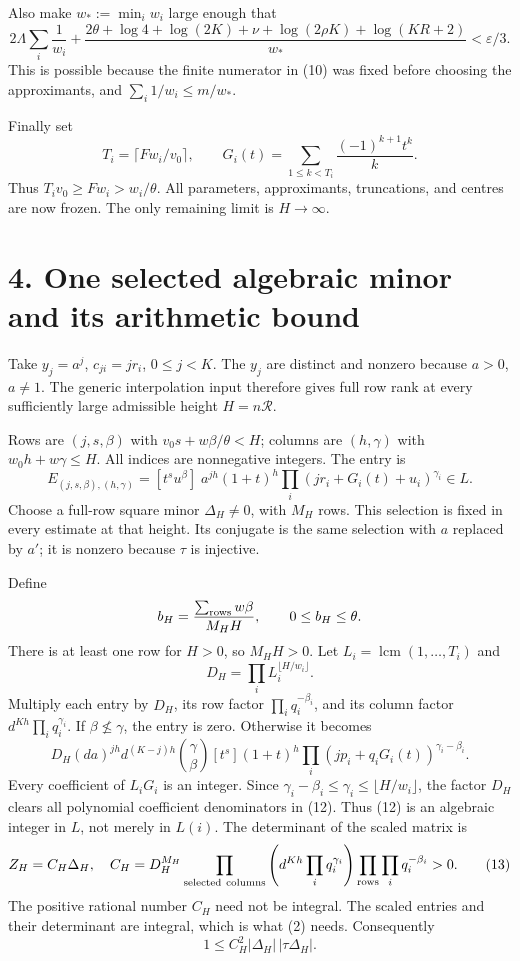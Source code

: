 \documentclass[11pt]{article}
\begin{document}
Also make \(w_*:=\min_iw_i\) large enough that \[
2\Lambda\sum_i\frac1{w_i}
+\frac{2\theta+\log4+\log(2K)+\nu+\log(2\rho K)+\log(KR+2)}{w_*}
<\varepsilon/3.                                    \tag{10}
\] This is possible because the finite numerator in (10) was fixed
before choosing the approximants, and \(\sum_i1/w_i\le m/w_*\).

Finally set \[
T_i=\lceil Fw_i/v_0\rceil,\qquad
G_i(t)=\sum_{1\le k<T_i}\frac{(-1)^{k+1}t^k}{k}.
\] Thus \(T_iv_0\ge Fw_i>w_i/\theta\). All parameters, approximants,
truncations, and centres are now frozen. The only remaining limit is
\(H\to\infty\).

\section{4. One selected algebraic minor and its arithmetic
bound}\label{one-selected-algebraic-minor-and-its-arithmetic-bound}

Take \(y_j=a^j\), \(c_{ji}=jr_i\), \(0\le j<K\). The \(y_j\) are
distinct and nonzero because \(a>0\), \(a\ne1\). The generic
interpolation input therefore gives full row rank at every sufficiently
large admissible height \(H=n\mathcal R\).

Rows are \((j,s,\beta)\) with \(v_0s+w\beta/\theta<H\); columns are
\((h,\gamma)\) with \(w_0h+w\gamma\le H\). All indices are nonnegative
integers. The entry is \[
E_{(j,s,\beta),(h,\gamma)}
=[t^su^\beta]\;a^{jh}(1+t)^h\prod_i(jr_i+G_i(t)+u_i)^{\gamma_i}\in L. \tag{11}
\] Choose a full-row square minor \(\Delta_H\ne0\), with \(M_H\) rows.
This selection is fixed in every estimate at that height. Its conjugate
is the same selection with \(a\) replaced by \(a'\); it is nonzero
because \(\tau\) is injective.

Define \[
b_H=\frac{\sum_{\rm rows}w\beta}{M_HH},\qquad0\le b_H\le\theta.
\] There is at least one row for \(H>0\), so \(M_HH>0\). Let
\(L_i=\operatorname{lcm}(1,\ldots,T_i)\) and \[
D_H=\prod_iL_i^{\lfloor H/w_i\rfloor}.
\] Multiply each entry by \(D_H\), its row factor
\(\prod_iq_i^{-\beta_i}\), and its column factor
\(d^{Kh}\prod_iq_i^{\gamma_i}\). If \(\beta\not\le\gamma\), the entry is
zero. Otherwise it becomes \[
D_H(da)^{jh}d^{(K-j)h}\binom\gamma\beta
[t^s](1+t)^h\prod_i(jp_i+q_iG_i(t))^{\gamma_i-\beta_i}. \tag{12}
\] Every coefficient of \(L_iG_i\) is an integer. Since
\(\gamma_i-\beta_i\le\gamma_i\le\lfloor H/w_i\rfloor\), the factor
\(D_H\) clears all polynomial coefficient denominators in (12). Thus
(12) is an algebraic integer in \(L\), not merely in \(L(i)\). The
determinant of the scaled matrix is \[
Z_H=C_H\Delta_H,\quad
C_H=D_H^{M_H}
\prod_{\rm selected\ columns}\left(d^{Kh}\prod_iq_i^{\gamma_i}\right)
\prod_{\rm rows}\prod_iq_i^{-\beta_i}>0.              \tag{13}
\] The positive rational number \(C_H\) need not be integral. The scaled
entries and their determinant are integral, which is what (2) needs.
Consequently \[
1\le C_H^2|\Delta_H|\,|\tau\Delta_H|.               \tag{14}
\]
\end{document}
